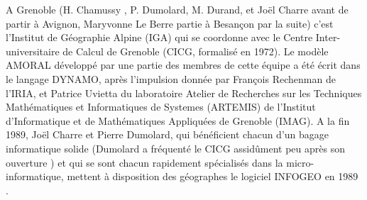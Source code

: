 
A Grenoble (H. Chamussy , P. Dumolard, M. Durand, et Joël Charre avant de partir à Avignon, Maryvonne Le Berre partie à Besançon par la suite) c’est l’Institut de Géographie Alpine (IGA) qui se coordonne avec le Centre Inter-universitaire de Calcul de Grenoble (CICG, formalisé en 1972). Le modèle AMORAL développé par une partie des membres de cette équipe a été écrit dans le langage DYNAMO, après l'impulsion donnée par François Rechenman de l'IRIA, et Patrice Uvietta du laboratoire Atelier de Recherches sur les Techniques Mathématiques et Informatiques de Systemes (ARTEMIS) de l’Institut d'Informatique et de Mathématiques Appliquées de Grenoble (IMAG). A la fin 1989, Joël Charre et Pierre Dumolard, qui bénéficient chacun d'un bagage informatique solide (Dumolard a fréquenté le CICG assidûment peu après son ouverture \autocite[323]{Cuyala2014}) et qui se sont chacun rapidement spécialisés dans la micro-informatique, mettent à disposition des géographes le logiciel INFOGEO en 1989 \autocites{Charre1989,Theriault1989,Ferrier1991}.  %

